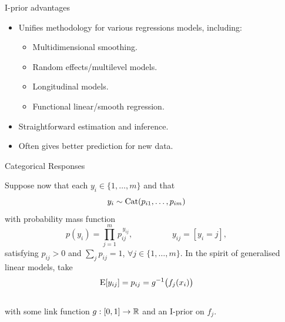 \documentclass{beamer}
\newlength{\onecolwid}
\newlength{\twocolwid}
\begin{document}
\begin{frame}[t]
\begin{columns}[t]
\begin{column}{\twocolwid}
\begin{columns}[t,totalwidth=\twocolwid]
\begin{column}{\onecolwid}
\begin{alertblock}{I-prior advantages}
\begin{itemize}
  \item Unifies methodology for various regressions models, including: 
  \begin{itemize}
    \item Multidimensional smoothing.
    \item Random effects/multilevel models.
    \item Longitudinal models.
    \item Functional linear/smooth regression.
  \end{itemize}
  \item Straightforward estimation and inference.
  \item Often gives better prediction for new data.
\end{itemize}


\end{alertblock}


\begin{block}{Categorical Responses}

Suppose now that each $y_i \in \{ 1,\dots,m \}$ and that 
\[
  y_i \sim \operatorname{Cat}(p_{i1},\dots,p_{im})
\]
with probability mass function
\[
  p(y_i) = \prod_{j=1}^m p_{ij}^{\, y_{ij}}, \hspace{2cm} y_{ij} = [y_i = j],
\]  
satisfying $p_{ij} > 0$ and $\sum_j p_{ij} = 1$, $\forall j \in \{ 1,\dots,m \}$.
In the spirit of generalised linear models, take
~\\[-20pt]
\[
  \operatorname{E}[y_{ij}] = p_{ij} = g^{-1}\big(f_j(x_i)\big)
\]
~\\[-28pt]
with some link function $g:[0,1] \to \mathbb{R}$ and an I-prior on $f_j$.
 
\end{block}

\end{column} %



\begin{column}{\onecolwid}  %




\end{column}
\end{columns}
\end{column}
\end{columns}
\end{frame}
\end{document}
